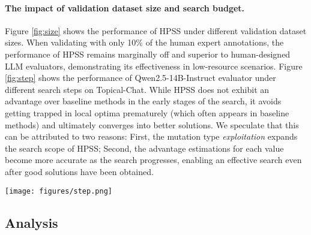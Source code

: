 \paragraph{The impact of validation dataset size and search budget.} 
Figure \ref{fig:size} shows the performance of HPSS under different validation dataset sizes.
When validating with only 10\% of the human expert annotations, 
the performance of HPSS remains marginally off and superior to human-designed LLM evaluators, 
demonstrating its effectiveness in low-resource scenarios.
Figure \ref{fig:step} shows the performance of Qwen2.5-14B-Instruct evaluator under different search steps on Topical-Chat. 
While HPSS does not exhibit an advantage over baseline methods in the early stages of the search, it avoids getting trapped in local optima prematurely (which often appears in baseline methods) and ultimately converges into better solutions. 
We speculate that this can be attributed to two reasons: 
First, the mutation type \textit{exploitation} expands the search scope of HPSS; 
Second, the advantage estimations for each value become more accurate as the search progresses, enabling an effective search even after good solutions have been obtained. 


\begin{figure*}[t]
\scriptsize
    \centering
    \texttt{[image: figures/step.png]}
    \vspace{-5mm}
    \caption{Performance of Qwen2.5-14B-Instruct evaluator under different search steps on Topical-Chat. The first 21 steps for HPSS are in \textbf{Initialization}, which also serves as the initial search history for OPRO, causing the two methods to produce identical results during these steps. Post-convergence results are omitted.} 
    \label{fig:step}
    \vspace{-4mm}
\end{figure*}


\subsection{Analysis}
